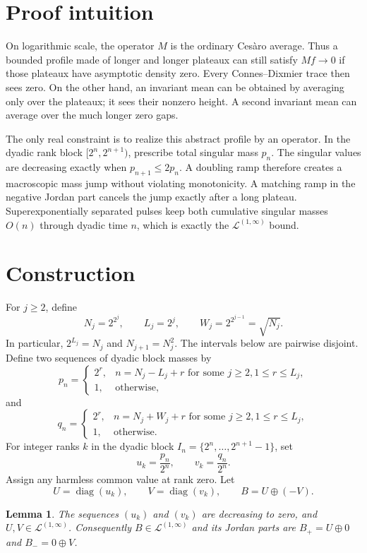 \documentclass[11pt]{article}
\newtheorem{lemma}{Lemma}
\newcommand{\Mideal}{\mathcal L^{(1,\infty)}}
\begin{document}
\section{Proof intuition}

On logarithmic scale, the operator $M$ is the ordinary Ces\`aro average.
Thus a bounded profile made of longer and longer plateaux can still satisfy
$Mf\to0$ if those plateaux have asymptotic density zero.  Every
Connes--Dixmier trace then sees zero.  On the other hand, an invariant mean
can be obtained by averaging only over the plateaux; it sees their nonzero
height.  A second invariant mean can average over the much longer zero gaps.

The only real constraint is to realize this abstract profile by an operator.
In the dyadic rank block $[2^n,2^{n+1})$, prescribe total singular mass
$p_n$.  The singular values are decreasing exactly when
$p_{n+1}\le 2p_n$.  A doubling ramp therefore creates a macroscopic mass
jump without violating monotonicity.  A matching ramp in the negative Jordan
part cancels the jump exactly after a long plateau.  Superexponentially
separated pulses keep both cumulative singular masses $O(n)$ through dyadic
time $n$, which is exactly the $\Mideal$ bound.

\section{Construction}

For $j\ge2$, define
\[
 N_j=2^{2^j},\qquad L_j=2^j,\qquad W_j=2^{2^{j-1}}=\sqrt{N_j}.
\]
In particular, $2^{L_j}=N_j$ and $N_{j+1}=N_j^2$.  The intervals below are
pairwise disjoint.  Define two sequences of dyadic block masses by
\[
 p_n=\begin{cases}
  2^r,&n=N_j-L_j+r\text{ for some }j\ge2, 1\le r\le L_j,\\
  1,&\text{otherwise},
 \end{cases}
\]
and
\[
 q_n=\begin{cases}
  2^r,&n=N_j+W_j+r\text{ for some }j\ge2, 1\le r\le L_j,\\
  1,&\text{otherwise}.
 \end{cases}
\]
For integer ranks $k$ in the dyadic block
$I_n=\{2^n,\ldots,2^{n+1}-1\}$, set
\[
 u_k=\frac{p_n}{2^n},\qquad v_k=\frac{q_n}{2^n}.
\]
Assign any harmless common value at rank zero.  Let
\[
 U=\operatorname{diag}(u_k),\qquad
 V=\operatorname{diag}(v_k),\qquad
 B=U\oplus(-V).
\]

\begin{lemma}\label{lem:ideal}
The sequences $(u_k)$ and $(v_k)$ are decreasing to zero, and
$U,V\in\Mideal$.  Consequently $B\in\Mideal$ and its Jordan parts are
$B_+=U\oplus0$ and $B_-=0\oplus V$.
\end{lemma}
\end{document}
